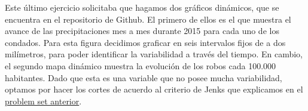 \documentclass[12pt]{article}
\begin{document}
Este \'ultimo ejercicio solicitaba que hagamos dos gr\'aficos din\'amicos, que se encuentra en el repositorio de Github. El primero de ellos es el que muestra el avance de las precipitaciones mes a mes durante 2015 para cada uno de los condados. Para esta figura decidimos graficar en seis intervalos fijos de a dos mil\'imetros, para poder identificar la variabilidad a trav\'es del tiempo. En cambio, el segundo mapa din\'amico muestra la evoluci\'on de los robos cada 100.000 habitantes. Dado que esta es una variable que no posee mucha variabilidad, optamos por hacer los cortes de acuerdo al criterio de Jenks que explicamos en el \href{https://github.com/AbigailRiquelme/HerramientasPS2/raw/main/PS2_Herramientas_PachecoRiquelme.pdf}{problem set anterior}. 


\end{document}
